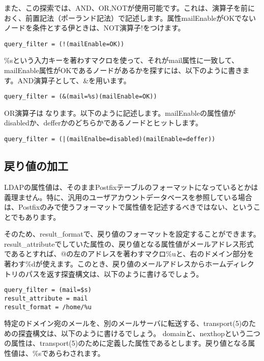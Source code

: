 また、この探索では、AND、OR,NOTが使用可能です。これは、演算子を前におく、前置記法（ポーランド記法）で記述します。属性mailEnableがOKでないノードを条件とする伊ときは、NOT演算子!をつけます。

\begin{verbatim}
query_filter = (!(mailEnable=OK))
\end{verbatim}

\%sという入力キーを著わすマクロを使って、それがmail属性に一致して、mailEnable属性がOKであるノードがあるかを探すには、以下のように書きます。AND演算子として、\&を用います。

\begin{verbatim}
query_filter = (&(mail=%s)(mailEnable=OK))
\end{verbatim}

OR演算子は\|になります。以下のように記述します。mailEnableの属性値がdisabledか、defferかのどちらかであるノードとヒットします。

\begin{verbatim}
query_filter = (|(mailEnalbe=disabled)(mailEnable=deffer))
\end{verbatim}



\subsection{戻り値の加工}

LDAPの属性値は、そのままPostfixテーブルのフォーマットになっているとかは義理ません。特に、汎用のユーザアカウントデータベースを参照している場合は、Postfixのみで使うフォーマットで属性値を記述するべきではない、ということでもあります。

そのため、result\_formatで、戻り値のフォーマットを設定することができます。result\_attributeでしていた属性の、戻り値となる属性値がメールアドレス形式であるとすれば、@の左のアドレスを著わすマクロ\%uと、右のドメイン部分を著わす\%dが使えます。このとき、戻り値のメールアドレスからホームディレクトリのパスを返す探査構文は、以下のように書けるでしょう。

\begin{verbatim}
query_filter = (mail=$s)
result_attribute = mail
result_format = /home/%u
\end{verbatim}

特定のドメイン宛のメールを、別のメールサーバに転送する、transport(5)のための探査構文は、以下のように書けるでしょう。
domainと、nexthopという二つの属性は、transport(5)のために定義した属性であるとします。戻り値となる属性値は、\%sであらわされます。


